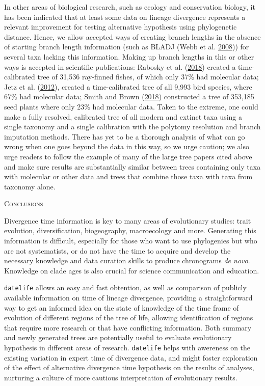 \documentclass[]{article}
\begin{document}
In other areas of biological research, such as ecology and conservation biology, it has been indicated that at least some data on lineage divergence represents a relevant improvement for testing alternative hypothesis using phylogenetic distance. Hence, we allow accepted ways of creating branch lengths in the absence of starting branch length information (such as BLADJ (Webb et al. \protect\hyperlink{ref-Webb2008}{2008})) for several taxa lacking this information. Making up branch lengths in this or other ways is accepted in scientific publications: Rabosky et al. (\protect\hyperlink{ref-rabosky2018inverse}{2018}) created a time-calibrated tree of 31,536 ray-finned fishes, of which only 37\% had molecular data; Jetz et al. (\protect\hyperlink{ref-Jetz2012}{2012}), created a time-calibrated tree of all 9,993 bird species, where 67\% had molecular data; Smith and Brown (\protect\hyperlink{ref-smith2018constructing}{2018}) constructed a tree of 353,185 seed plants where only 23\% had molecular data. Taken to the extreme, one could make a fully resolved, calibrated tree of all modern and extinct taxa using a single taxonomy and a single calibration with the polytomy resolution and branch imputation methods. There has yet to be a thorough analysis of what can go wrong when one goes beyond the data in this way, so we urge caution; we also urge readers to follow the example of many of the large tree papers cited above and make sure results are substantially similar between trees containing only taxa with molecular or other data and trees that combine those taxa with taxa from taxonomy alone.

\begin{center}
\textsc{Conclusions}
\end{center}

Divergence time information is key to many areas of evolutionary studies: trait evolution,
diversification, biogeography, macroecology and more. Generating this information is difficult,
especially for those who want to use phylogenies but who are not systematists, or
do not have the time to acquire and develop the necessary knowledge and data curation skills
to produce chronograms \emph{de novo}. Knowledge on clade ages is also crucial for
science communication and education.

\texttt{datelife} allows an easy and fast obtention, as well as comparison of publicly available information
on time of lineage divergence, providing a straightforward way to get an informed idea on the state of knowledge of the time frame of evolution of different regions of the tree of life, allowing identification of regions that require more research or that have conflicting information.
Both summary and newly generated trees are potentially useful to evaluate evolutionary hypothesis in different areas of research. \texttt{datelife} helps with awereness on the existing variation in expert time of divergence data, and might foster exploration of the effect of alternative divergence time hypothesis on the results of analyses, nurturing a culture of more cautious interpretation of evolutionary results.
\end{document}
